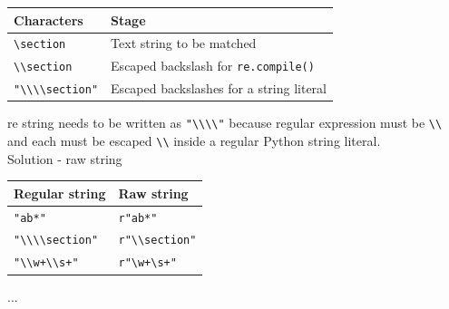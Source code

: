 \documentclass{beamer}
\begin{document}
\begin{frame}[fragile]
\begin{tabular}{ | l | p{7cm} |}
\hline
Characters & Stage \\ \hline
\verb/\section/ & Text string to be matched \\
\verb/\\section/ & Escaped backslash for \verb/re.compile()/ \\
\verb/"\\\\section"/ & Escaped backslashes for a string literal \\
\hline
\end{tabular}
\pause
re string needs to be written as \verb/"\\\\"/ because regular expression must be \verb/\\/ and each must be escaped \verb/\\/ inside a regular Python string literal. \\
\pause
Solution - raw string
\begin{tabular}{ | l | p{7cm} |}
\hline
Regular string & Raw string \\ \hline
\verb/"ab*"/ & \verb/r"ab*"/ \\
\verb/"\\\\section"/ & \verb/r"\\section"/ \\
\verb/"\\w+\\s+"/ & \verb/r"\w+\s+"/ \\
\hline
\end{tabular}
\end{frame}

... 
\end{document}
